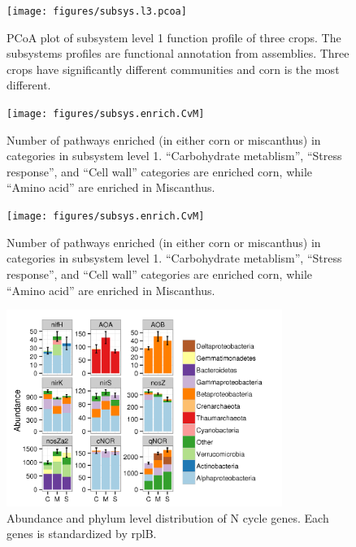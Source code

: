 \documentclass[12pt]{article}
\begin{document}
{    \begin{figure}[tbph!]
    \centering
    \texttt{[image: figures/subsys.l3.pcoa]}
    \caption[PCoA plot based on subsystem profile]{PCoA plot of subsystem level 1 function profile of three crops. The subsystems profiles are functional annotation from assemblies. Three crops have significantly different communities and corn is the most different.}
    \label{fig:subsys.l3.pcoa}
    \end{figure}


    \begin{figure}[tbph!]
    \centering
    \texttt{[image: figures/subsys.enrich.CvM]}
    \caption[Number of pathways enriched in categories in subsystem level 1]{Number of pathways enriched (in either corn or miscanthus) in categories in subsystem level 1. ``Carbohydrate metablism'', ``Stress response'', and ``Cell wall'' categories are enriched corn, while ``Amino acid'' are enriched in Miscanthus.}
    \label{fig:subsys.enrich.CvM}
    \end{figure}


    \begin{figure}[tbph!]
    \centering
    \texttt{[image: figures/subsys.enrich.CvM]}
    \caption[Number of pathways enriched in categories in subsystem level 1]{Number of pathways enriched (in either corn or miscanthus) in categories in subsystem level 1. ``Carbohydrate metablism'', ``Stress response'', and ``Cell wall'' categories are enriched corn, while ``Amino acid'' are enriched in Miscanthus.}
    \label{fig:subsys.enrich.CvM}
    \end{figure}


    \begin{figure}[tbph!]
    \centering
    \includegraphics[width=0.8\textwidth]{figures/xander.ncycle.abun}
    \caption[Abundance and phylum level distribution of N cycle genes]{Abundance and phylum level distribution of N cycle genes. Each genes is standardized by rplB.}
    \label{fig:xander.ncycle.abun}
    \end{figure}


}
\end{document}
